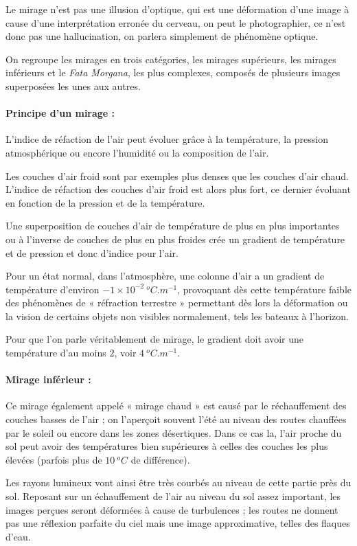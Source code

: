 \documentclass[a4paper, 12pt, onecolumn, openany]{report}
\begin{document}
	Le mirage n’est pas une illusion d’optique, qui est une déformation d’une image à cause d’une interprétation erronée du cerveau, on peut le photographier, ce n’est donc pas une hallucination, on parlera simplement de phénomène optique. 
	
	On regroupe les mirages en trois catégories, les mirages supérieurs, les mirages inférieurs et le \textit{Fata Morgana}, les plus complexes, composés de plusieurs images superposées les unes aux autres. 

\paragraph{Principe d'un mirage :}
	L’indice de réfaction de l’air peut évoluer grâce à la température, la pression atmosphérique ou encore l’humidité ou la composition de l’air. 

	Les couches d’air froid sont par exemples plus denses que les couches d’air chaud. 
L’indice de réfaction des couches d’air froid est alors plus fort, ce dernier évoluant en fonction de la pression et de la température. 

	Une superposition de couches d’air de température de plus en plus importantes ou à l’inverse de couches de plus en plus froides crée un gradient de température et de pression et donc d’indice pour l’air. 

	Pour un état normal, dans l’atmosphère, une colonne d’air a un gradient de température d’environ $-1\times 10^{-2} ~^{o}C.m^{-1}$, provoquant dès cette température faible des phénomènes de « réfraction terrestre » permettant dès lors la déformation ou la vision de certains objets non visibles normalement, tels les bateaux à l’horizon. 
	
	Pour que l’on parle véritablement de mirage, le gradient doit avoir une température d’au moins $2$, voir $4 ~^{o}C.m^{-1}$. 


\paragraph{Mirage inférieur :}
	Ce mirage également appelé « mirage chaud » est causé par le réchauffement des couches basses de l’air ; on l’aperçoit souvent l’été au niveau des routes chauffées par le soleil ou encore dans les zones désertiques. 
Dans ce cas la, l’air proche du sol peut avoir des températures bien supérieures à celles des couches les plus élevées (parfois plus de $10 ~^{o}C$ de différence).

	Les rayons lumineux vont ainsi être très courbés au niveau de cette partie près du sol. Reposant sur un échauffement de l’air au niveau du sol assez important, les images perçues seront déformées à cause de turbulences ; les routes ne donnent pas une réflexion parfaite du ciel mais une image approximative, telles des flaques d’eau. 
\end{document}
